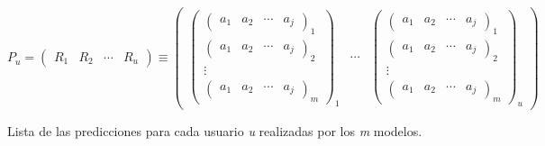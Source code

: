 \[  
    \textit{P$_{u}$}=
    \begin{pmatrix}
        \textit{R$_{1}$} & \textit{R$_{2}$} & \cdots & \textit{R$_{u}$}
    \end{pmatrix}
    \equiv
    \begin{pmatrix}
        \begin{pmatrix}
            \begin{pmatrix} a_{1}  &  a_{2}  &  \cdots   & a_{j} \end{pmatrix}_{1} \\ 
            \begin{pmatrix} a_{1}  &  a_{2}  &  \cdots   & a_{j} \end{pmatrix}_{2} \\ 
            \vdots \\ 
            \begin{pmatrix} a_{1}  &  a_{2}  &  \cdots   & a_{j} \end{pmatrix}_{m}
        \end{pmatrix}_{\textit{1}}
        & 
        \cdots 
        &
        \begin{pmatrix}
            \begin{pmatrix} a_{1}  &  a_{2}  &  \cdots   & a_{j} \end{pmatrix}_{1} \\ 
            \begin{pmatrix} a_{1}  &  a_{2}  &  \cdots   & a_{j} \end{pmatrix}_{2} \\ 
            \vdots \\ 
            \begin{pmatrix} a_{1}  &  a_{2}  &  \cdots   & a_{j} \end{pmatrix}_{m}
        \end{pmatrix}_{\textit{u}}
    \end{pmatrix}
\] 
\begin{center}
    Lista de las predicciones para cada usuario \textit{u} realizadas por los \textit{m} modelos.
\end{center}

